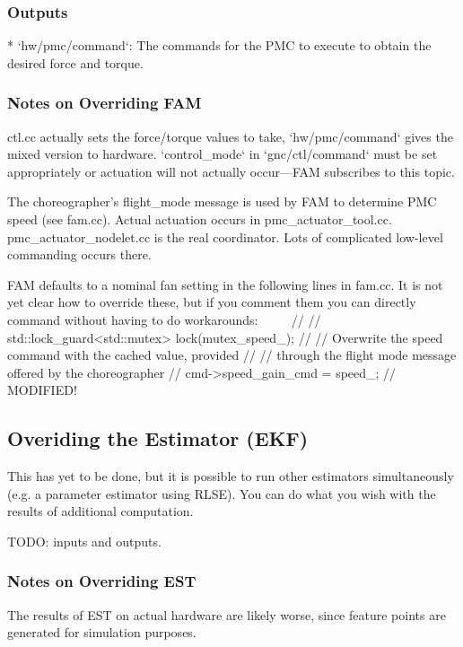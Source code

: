 \documentclass{article}
\begin{document}
\subsubsection{Outputs}
\begin{markdown}
* `hw/pmc/command`: The commands for the PMC to execute to obtain the desired force and torque.
\end{markdown}

\subsubsection{Notes on Overriding FAM}
\begin{markdown}
ctl.cc actually sets the force/torque values to take, `hw/pmc/command` gives the mixed version to hardware. `control_mode` in `gnc/ctl/command` must be set appropriately or actuation will not actually occur---FAM subscribes to this topic.


The choreographer's flight\_mode message is used by FAM to determine PMC speed (see fam.cc). Actual actuation occurs in pmc\_actuator\_tool.cc. pmc\_actuator\_nodelet.cc is the real coordinator. Lots of complicated low-level commanding occurs there.

FAM defaults to a nominal fan setting in the following lines in fam.cc. It is not yet clear how to override these, but if you comment them you can directly command without having to do workarounds:
~~~~
// {
//   std::lock_guard<std::mutex> lock(mutex_speed_);
//   // Overwrite the speed command with the cached value, provided
//   // through the flight mode message offered by the choreographer
//   cmd->speed_gain_cmd = speed_;
// } MODIFIED!
 ~~~~
\end{markdown}

\subsection{Overiding the Estimator (EKF)}

This has yet to be done, but it is possible to run other estimators simultaneously (e.g. a parameter estimator using RLSE). You can do what you wish with the results of additional computation.

TODO: inputs and outputs.

\subsubsection{Notes on Overriding EST}
The results of EST on actual hardware are likely worse, since feature points are generated for simulation purposes.
\end{document}

